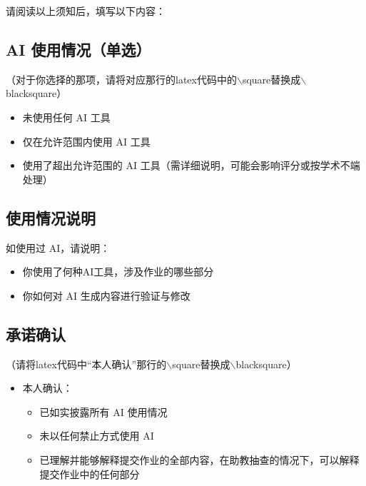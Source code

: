 \documentclass[12pt,letterpaper]{article}
\begin{document}
请阅读以上须知后，填写以下内容：

\subsection{AI 使用情况（单选）}
（对于你选择的那项，请将对应那行的latex代码中的$\backslash$square替换成$\backslash$blacksquare） 

\begin{itemize}
    \item[$\square$] 未使用任何 AI 工具
    \item[$\square$] 仅在允许范围内使用 AI 工具
    \item[$\square$] 使用了超出允许范围的 AI 工具（需详细说明，可能会影响评分或按学术不端处理）
\end{itemize}

\subsection{使用情况说明}
如使用过 AI，请说明：
\begin{itemize}
    \item 你使用了何种AI工具，涉及作业的哪些部分
    \item 你如何对 AI 生成内容进行验证与修改
\end{itemize}


\subsection{承诺确认}
（请将latex代码中“本人确认”那行的$\backslash$square替换成$\backslash$blacksquare）
\begin{itemize}
    \item[$\square$] 本人确认：
    \begin{itemize}
        \item 已如实披露所有 AI 使用情况
        \item 未以任何禁止方式使用 AI
        \item 已理解并能够解释提交作业的全部内容，在助教抽查的情况下，可以解释提交作业中的任何部分
    \end{itemize}
\end{itemize}




\end{document}
